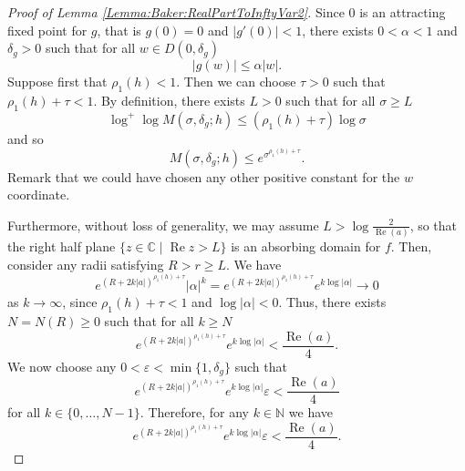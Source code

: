 \documentclass[10pt,a4paper]{amsart}
\newcommand{\C}{{\mathbb C}}
\newcommand{\re}{\operatorname{Re}}
\renewcommand{\Re}{\operatorname{Re}}
\begin{document}
\begin{proof}[Proof of Lemma {\ref{Lemma:Baker:RealPartToInftyVar2}}]
    Since $0$ is an attracting fixed point for $g$, that is $g(0) = 0$ and $\lvert g'(0) \rvert < 1$, there exists $0 < \alpha < 1$ and $\delta_g > 0$ such that for all $w \in D(0,\delta_g)$
	\begin{equation}
		\lvert g(w) \rvert \leq \alpha \lvert w \rvert.
	\end{equation}
Suppose first that  $\rho_1(h) < 1$.  Then we can choose $\tau > 0$ such that ${\rho_1(h) + \tau < 1}$. By definition, there exists $L > 0$ such that for all $\sigma \geq L$
	\begin{equation*}
		\log^+ \log M(\sigma, \delta_g; h) \leq (\rho_1(h) + \tau) \log \sigma 
	\end{equation*}
	and so
	\begin{equation*}
		M(\sigma, \delta_g; h) \leq e^{\sigma^{\rho_1(h) + \tau}}.
	\end{equation*}
	Remark that we could have chosen any other positive constant for the $w$ coordinate. 
	
	Furthermore, without loss of generality, we may assume $L > \log \frac{2}{\Re(a)}$, so that the right half plane $\{z\in\C\mid \re z>L\}$ is an absorbing domain for $f$. %
	Then, consider any radii satisfying $R>r\ge L$.
	We have
	\begin{equation*}
		e^{(R + 2k \lvert a \rvert)^{\rho_1(h) + \tau}} \lvert \alpha \rvert^k  = e^{(R + 2k \lvert a \rvert)^{\rho_1(h) + \tau}} e^{k \log \lvert \alpha \rvert} \to 0
	\end{equation*}
	as $k \to \infty$, since $\rho_1(h) + \tau < 1$ and $\log\lvert \alpha \rvert < 0$. 
	Thus, there exists $N = N(R)\ge0$ such that for all $k \geq N$
	\begin{equation*}\label{Lemma:Baker:RealPartToInftyVar2:ProofPropN}
		e^{(R + 2k \lvert a \rvert)^{\rho_1(h) + \tau}} e^{k  \log \lvert \alpha \rvert} < \frac{\Re(a)}{4}.
	\end{equation*}
	We now choose any $0 < \varepsilon < \min\lbrace 1,\delta_g \rbrace$ such that
	\begin{equation*}\label{Lemma:Baker:RealPartToInftyVar2:ProofPropEps}
		e^{(R + 2k \lvert a \rvert)^{\rho_1(h) + \tau}} e^{k  \log \lvert \alpha \rvert} \varepsilon < \frac{\Re(a)}{4}
	\end{equation*}
	for all $k \in \lbrace 0, \dots, N-1 \rbrace$.
	Therefore, for any $k \in \mathbb{N}$ we have
	\begin{equation}\label{Lemma:Baker:RealPartToInftyVar2:ProofPropCombined}
		e^{(R + 2k \lvert a \rvert)^{\rho_1(h) + \tau}} e^{k  \log \lvert \alpha \rvert} \varepsilon < \frac{\Re(a)}{4}.
	\end{equation}
	

\end{proof}
\end{document}
